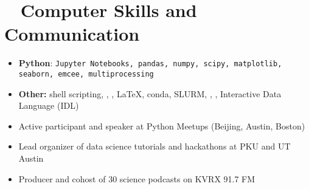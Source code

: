 \documentclass[10pt,letterpaper]{article}
\begin{document}
\section*{\faTerminal ~ Computer Skills and Communication}

\begin{itemize}
    \item \textbf{Python}: \texttt{Jupyter Notebooks, pandas, numpy, scipy, matplotlib, seaborn, emcee, multiprocessing}
    \item \textbf{Other:} shell scripting, \faGit, \faGithubAlt, \LaTeX, conda, SLURM,  \faApple, \faLinux, Interactive Data Language (IDL)
    \item Active participant and speaker at Python Meetups (Beijing, Austin, Boston)
    \item Lead organizer of data science tutorials and hackathons at PKU and UT Austin
    \item Producer and cohost of 30 science podcasts on KVRX 91.7 FM
\end{itemize}
\end{document}
